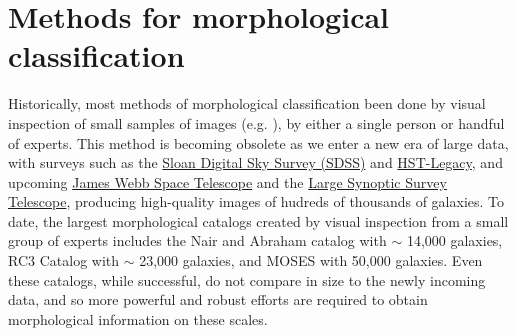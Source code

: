 \section{Methods for morphological classification}

Historically, most methods of morphological classification been done by visual inspection of small samples of images (e.g. \citet{Hubble1926,Sandage1961,DeVaucouleurs1963,Block1994,Eskridge2002,Buta2010}), by either a single person or handful of experts. This method is becoming obsolete as we enter a new era of large data, with surveys such as the \href{www.sdss.org}{Sloan Digital Sky Survey (SDSS)} and \href{https://hla.stsci.edu/}{HST-Legacy}, and upcoming \href{https://www.jwst.nasa.gov/}{James Webb Space Telescope} and the \href{https://www.lsst.org/}{Large Synoptic Survey Telescope}, producing high-quality images of hudreds of thousands of galaxies. To date, the largest morphological catalogs created by visual inspection from a small group of experts includes the Nair and Abraham catalog \citep{Nair2010} with $\sim$ 14,000 galaxies, RC3 Catalog \citep{RC31991} with $\sim$ 23,000 galaxies, and MOSES \citep{Schawinski2007} with 50,000 galaxies. Even these catalogs, while successful, do not compare in size to the newly incoming data, and so more powerful and robust efforts are required to obtain morphological information on these scales.


